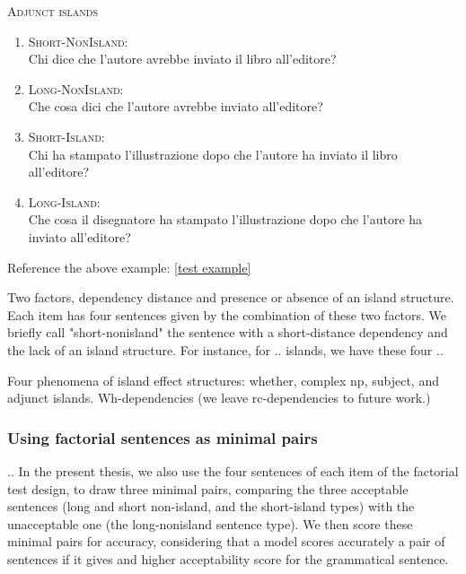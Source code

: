 \begin{example}
	\textsc{Adjunct islands}
		\renewcommand{\labelenumi}{\alph{enumi}.}
		\begin{enumerate}
			\item \textsc{Short-NonIsland:} \\
			Chi dice che l’autore avrebbe inviato il libro all’editore?
			\item \textsc{Long-NonIsland:} \\
			Che cosa dici che l'autore avrebbe inviato all’editore?
			\item \textsc{Short-Island:} \\
			Chi ha stampato l’illustrazione dopo che l'autore ha inviato il libro all’editore?
			\item \textsc{Long-Island:} \\				
			Che cosa il disegnatore ha stampato l’illustrazione dopo che l'autore ha inviato all’editore?
			
		\end{enumerate}

	\label{test example}
\end{example}

Reference the above example: \ref{test example}

Two factors, dependency distance and presence or absence of an island structure. Each item has four sentences given by the combination of these two factors. We briefly call "short-nonisland" the sentence with a short-distance dependency and the lack of an island structure. For instance, for .. islands, we have these four ..


Four phenomena of island effect structures: whether, complex np, subject, and adjunct islands. Wh-dependencies (we leave rc-dependencies to future work.)



\subsubsection{Using factorial sentences as minimal pairs}
..
In the present thesis, we also use the four sentences of each item of the factorial test design, to draw three minimal pairs, comparing the three acceptable sentences (long and short non-island, and the short-island types) with the unacceptable one (the long-nonisland sentence type). We then score these minimal pairs for accuracy, considering that a model scores accurately a pair of sentences if it gives and higher acceptability score for the grammatical sentence.

